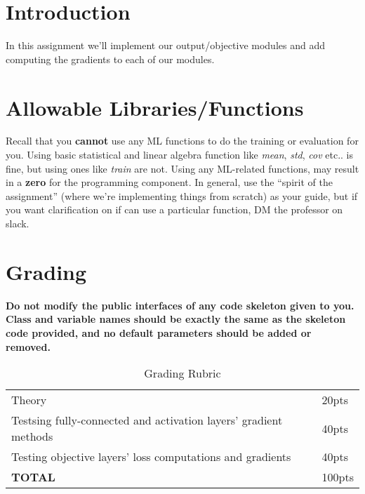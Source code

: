 \documentclass[12pt]{article}
\begin{document}
\maketitle


\section*{Introduction}
In this assignment we'll implement our output/objective modules and add computing the gradients to each of our modules.

\section*{Allowable Libraries/Functions}
Recall that you \textbf{cannot} use any ML functions to do the training or evaluation for you.  Using basic statistical and linear algebra function like \emph{mean}, \emph{std}, \emph{cov} etc.. is fine, but using ones like \emph{train} are not. Using any ML-related functions, may result in a \textbf{zero} for the programming component.  In general, use the ``spirit of the assignment'' (where we're implementing things from scratch) as your guide, but if you want clarification on if can use a particular function, DM the professor on slack.


\section*{Grading}
\textbf{Do not modify the public interfaces of any code skeleton given to you. Class and variable names should be exactly the same as the skeleton code provided, and no default parameters should be added or removed.}
\begin{table}[h]
\begin{center}
\begin{tabular}{|l|l|}
\hline
Theory & 20pts\\
Testsing fully-connected and activation layers' gradient methods & 40pts\\
Testing objective layers' loss computations and gradients & 40pts\\
\hline
\textbf{TOTAL} & 100pts \\
\hline
\end{tabular}
\caption{Grading Rubric}
\end{center}
\end{table}



\newpage
\end{document}
